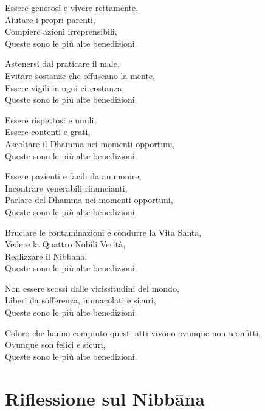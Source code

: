 Essere generosi e vivere rettamente,\\
Aiutare i propri parenti,\\
Compiere azioni irreprensibili,\\
Queste sono le più alte benedizioni.

Astenersi dal praticare il male,\\
Evitare sostanze che offuscano la mente,\\
Essere vigili in ogni circostanza,\\
Queste sono le più alte benedizioni.

Essere rispettosi e umili,\\
Essere contenti e grati,\\
Ascoltare il Dhamma nei momenti opportuni,\\
Queste sono le più alte benedizioni.

Essere pazienti e facili da ammonire,\\
Incontrare venerabili rinuncianti,\\
Parlare del Dhamma nei momenti opportuni,\\
Queste sono le più alte benedizioni.

\clearpage

Bruciare le contaminazioni e condurre la Vita Santa,\\
Vedere la Quattro Nobili Verità,\\
Realizzare il Nibbana,\\
Queste sono le più alte benedizioni.

Non essere scossi dalle vicissitudini del mondo,\\
Liberi da sofferenza, immacolati e sicuri,\\
Queste sono le più alte benedizioni.

Coloro che hanno compiuto questi atti vivono ovunque non sconfitti,\\
Ovunque son felici e sicuri,\\
Queste sono le più alte benedizioni.

\chapter[Nibbāna]{Riflessione sul Nibbāna}


\begin{leader}
\end{leader}

